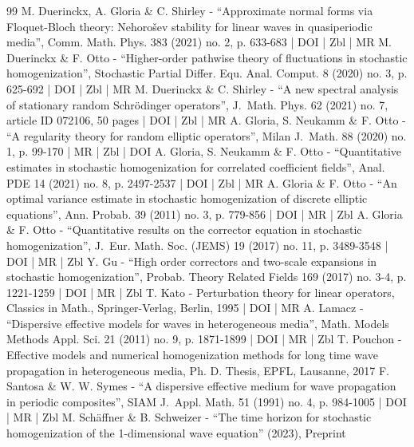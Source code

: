 \documentclass[10pt]{amsart}
\theoremstyle{plain}
\theoremstyle{definition}
\numberwithin{equation}{section}
\begin{document}
\begin{thebibliography}{99}
M. Duerinckx, A. Gloria \& C. Shirley - “Approximate normal forms via Floquet-Bloch theory: Nehorošev stability for linear waves in quasiperiodic media”, Comm. Math. Phys. 383 (2021) no. 2, p. 633-683 | DOI | Zbl | MR
M. Duerinckx \& F. Otto - “Higher-order pathwise theory of fluctuations in stochastic homogenization”, Stochastic Partial Differ. Equ. Anal. Comput. 8 (2020) no. 3, p. 625-692 | DOI | Zbl | MR
M. Duerinckx \& C. Shirley - “A new spectral analysis of stationary random Schrödinger operators”, J. Math. Phys. 62 (2021) no. 7, article ID 072106, 50 pages | DOI | Zbl | MR
A. Gloria, S. Neukamm \& F. Otto - “A regularity theory for random elliptic operators”, Milan J. Math. 88 (2020) no. 1, p. 99-170 | MR | Zbl | DOI
A. Gloria, S. Neukamm \& F. Otto - “Quantitative estimates in stochastic homogenization for correlated coefficient fields”, Anal. PDE 14 (2021) no. 8, p. 2497-2537 | DOI | Zbl | MR
A. Gloria \& F. Otto - “An optimal variance estimate in stochastic homogenization of discrete elliptic equations”, Ann. Probab. 39 (2011) no. 3, p. 779-856 | DOI | MR | Zbl
A. Gloria \& F. Otto - “Quantitative results on the corrector equation in stochastic homogenization”, J. Eur. Math. Soc. (JEMS) 19 (2017) no. 11, p. 3489-3548 | DOI | MR | Zbl
Y. Gu - “High order correctors and two-scale expansions in stochastic homogenization”, Probab. Theory Related Fields 169 (2017) no. 3-4, p. 1221-1259 | DOI | MR | Zbl
T. Kato - Perturbation theory for linear operators, Classics in Math., Springer-Verlag, Berlin, 1995 | DOI | MR
A. Lamacz - “Dispersive effective models for waves in heterogeneous media”, Math. Models Methods Appl. Sci. 21 (2011) no. 9, p. 1871-1899 | DOI | MR | Zbl
T. Pouchon - Effective models and numerical homogenization methods for long time wave propagation in heterogeneous media, Ph. D. Thesis, EPFL, Lausanne, 2017
F. Santosa \& W. W. Symes - “A dispersive effective medium for wave propagation in periodic composites”, SIAM J. Appl. Math. 51 (1991) no. 4, p. 984-1005 | DOI | MR | Zbl
M. Schäffner \& B. Schweizer - “The time horizon for stochastic homogenization of the 1-dimensional wave equation” (2023), Preprint
\end{thebibliography}
\end{document}
